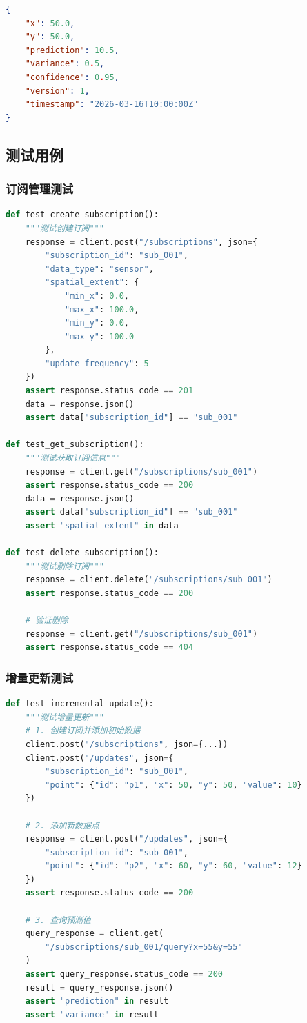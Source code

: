 \documentclass[12pt,a4paper,openany]{report}
\begin{document}
\begin{lstlisting}[language=JSON, caption=查询预测响应]
{
    "x": 50.0,
    "y": 50.0,
    "prediction": 10.5,
    "variance": 0.5,
    "confidence": 0.95,
    "version": 1,
    "timestamp": "2026-03-16T10:00:00Z"
}
\end{lstlisting}

\subsection{测试用例}

\subsubsection{订阅管理测试}

\begin{lstlisting}[language=Python, caption=订阅管理测试]
def test_create_subscription():
    """测试创建订阅"""
    response = client.post("/subscriptions", json={
        "subscription_id": "sub_001",
        "data_type": "sensor",
        "spatial_extent": {
            "min_x": 0.0,
            "max_x": 100.0,
            "min_y": 0.0,
            "max_y": 100.0
        },
        "update_frequency": 5
    })
    assert response.status_code == 201
    data = response.json()
    assert data["subscription_id"] == "sub_001"

def test_get_subscription():
    """测试获取订阅信息"""
    response = client.get("/subscriptions/sub_001")
    assert response.status_code == 200
    data = response.json()
    assert data["subscription_id"] == "sub_001"
    assert "spatial_extent" in data

def test_delete_subscription():
    """测试删除订阅"""
    response = client.delete("/subscriptions/sub_001")
    assert response.status_code == 200

    # 验证删除
    response = client.get("/subscriptions/sub_001")
    assert response.status_code == 404
\end{lstlisting}

\subsubsection{增量更新测试}

\begin{lstlisting}[language=Python, caption=增量更新测试]
def test_incremental_update():
    """测试增量更新"""
    # 1. 创建订阅并添加初始数据
    client.post("/subscriptions", json={...})
    client.post("/updates", json={
        "subscription_id": "sub_001",
        "point": {"id": "p1", "x": 50, "y": 50, "value": 10}
    })

    # 2. 添加新数据点
    response = client.post("/updates", json={
        "subscription_id": "sub_001",
        "point": {"id": "p2", "x": 60, "y": 60, "value": 12}
    })
    assert response.status_code == 200

    # 3. 查询预测值
    query_response = client.get(
        "/subscriptions/sub_001/query?x=55&y=55"
    )
    assert query_response.status_code == 200
    result = query_response.json()
    assert "prediction" in result
    assert "variance" in result
\end{lstlisting}
\end{document}
